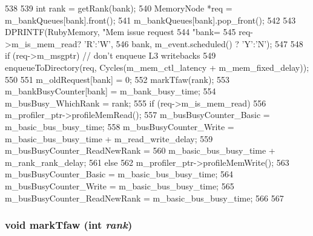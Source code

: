 \begin{DoxyCode}
538 {
539     int rank = getRank(bank);
540     MemoryNode *req = m_bankQueues[bank].front();
541     m_bankQueues[bank].pop_front();
542 
543     DPRINTF(RubyMemory, "Mem issue request%
544             "bank=%
545             req->m_is_mem_read? 'R':'W',
546             bank, m_event.scheduled() ? 'Y':'N');
547 
548     if (req->m_msgptr) {  // don't enqueue L3 writebacks
549         enqueueToDirectory(req, Cycles(m_mem_ctl_latency + m_mem_fixed_delay));
550     }
551     m_oldRequest[bank] = 0;
552     markTfaw(rank);
553     m_bankBusyCounter[bank] = m_bank_busy_time;
554     m_busBusy_WhichRank = rank;
555     if (req->m_is_mem_read) {
556         m_profiler_ptr->profileMemRead();
557         m_busBusyCounter_Basic = m_basic_bus_busy_time;
558         m_busBusyCounter_Write = m_basic_bus_busy_time + m_read_write_delay;
559         m_busBusyCounter_ReadNewRank =
560             m_basic_bus_busy_time + m_rank_rank_delay;
561     } else {
562         m_profiler_ptr->profileMemWrite();
563         m_busBusyCounter_Basic = m_basic_bus_busy_time;
564         m_busBusyCounter_Write = m_basic_bus_busy_time;
565         m_busBusyCounter_ReadNewRank = m_basic_bus_busy_time;
566     }
567 }
\end{DoxyCode}
\hypertarget{classRubyMemoryControl_a8fb7d0c7e12bbd524e3bcd193e66426c}{
\subsubsection[{markTfaw}]{\setlength{\rightskip}{0pt plus 5cm}void markTfaw (int {\em rank})}}
\label{classRubyMemoryControl_a8fb7d0c7e12bbd524e3bcd193e66426c}



